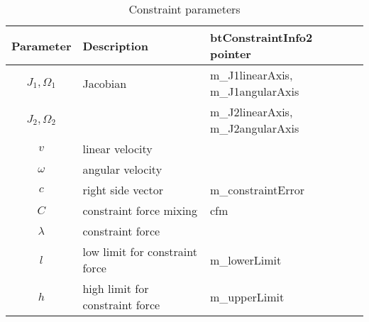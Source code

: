 \begin {table}[htb!]
\begin{center}
\begin{tabular}{|c| l| l|}
\hline
{\bf Parameter} & {\bf Description} & {\bf btConstraintInfo2 pointer}\\  \hline
$J_1, \Omega_1$ & Jacobian & m\_J1linearAxis, m\_J1angularAxis \\ 
$J_2, \Omega_2$ & & m\_J2linearAxis, m\_J2angularAxis \\ \hline
$v$ & linear velocity & \\ \hline
$\omega$ & angular velocity & \\ \hline
$c$        &  right side vector   & m\_constraintError \\ \hline
$C$  & constraint force mixing & cfm \\  \hline
$\lambda$ & constraint force &  \\ \hline
$l$ & low limit for constraint force & m\_lowerLimit \\ \hline
$h$ & high limit for constraint force & m\_upperLimit \\ \hline
\end {tabular}
\end{center}
\caption {Constraint parameters} \label{tab:constraintParameters} 
\end {table}